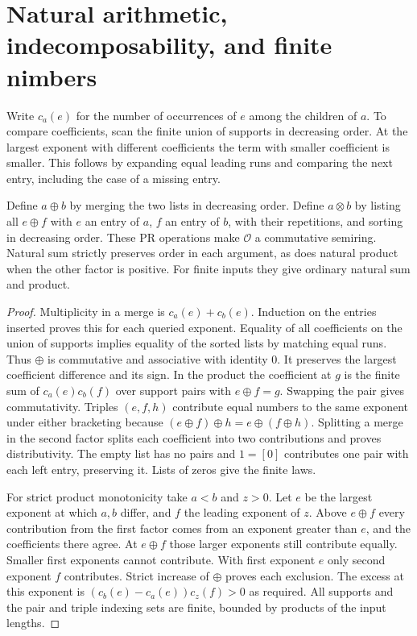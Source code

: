 \section{Natural arithmetic, indecomposability, and finite nimbers}
\label{sec:natural}
Write $c_a(e)$ for the number of occurrences of $e$ among the children of $a$. To compare coefficients, scan the finite union of supports in decreasing order. At the largest exponent with different coefficients the term with smaller coefficient is smaller. This follows by expanding equal leading runs and comparing the next entry, including the case of a missing entry.

\begin{theorem}\label{thm:hess}
Define $a\mathbin\oplus b$ by merging the two lists in decreasing order. Define $a\mathbin\otimes b$ by listing all $e\oplus f$ with $e$ an entry of $a$, $f$ an entry of $b$, with their repetitions, and sorting in decreasing order. These PR operations make $\mathcal O$ a commutative semiring. Natural sum strictly preserves order in each argument, as does natural product when the other factor is positive. For finite inputs they give ordinary natural sum and product.
\end{theorem}
\begin{proof}
Multiplicity in a merge is $c_a(e)+c_b(e)$. Induction on the entries inserted proves this for each queried exponent. Equality of all coefficients on the union of supports implies equality of the sorted lists by matching equal runs. Thus $\oplus$ is commutative and associative with identity $0$. It preserves the largest coefficient difference and its sign. In the product the coefficient at $g$ is the finite sum of $c_a(e)c_b(f)$ over support pairs with $e\oplus f=g$. Swapping the pair gives commutativity. Triples $(e,f,h)$ contribute equal numbers to the same exponent under either bracketing because $(e\oplus f)\oplus h=e\oplus(f\oplus h)$. Splitting a merge in the second factor splits each coefficient into two contributions and proves distributivity. The empty list has no pairs and $1=[0]$ contributes one pair with each left entry, preserving it. Lists of zeros give the finite laws.

For strict product monotonicity take $a<b$ and $z>0$. Let $e$ be the largest exponent at which $a,b$ differ, and $f$ the leading exponent of $z$. Above $e\oplus f$ every contribution from the first factor comes from an exponent greater than $e$, and the coefficients there agree. At $e\oplus f$ those larger exponents still contribute equally. Smaller first exponents cannot contribute. With first exponent $e$ only second exponent $f$ contributes. Strict increase of $\oplus$ proves each exclusion. The excess at this exponent is $(c_b(e)-c_a(e))c_z(f)>0$ as required. All supports and the pair and triple indexing sets are finite, bounded by products of the input lengths.
\end{proof}

